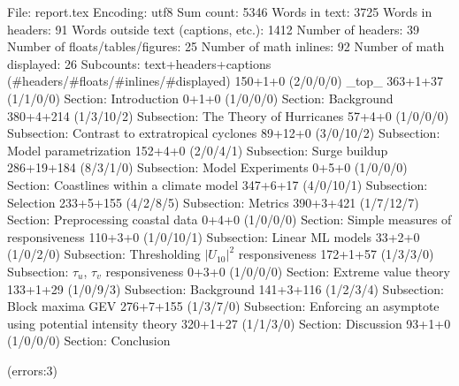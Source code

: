 
File: report.tex
Encoding: utf8
Sum count: 5346
Words in text: 3725
Words in headers: 91
Words outside text (captions, etc.): 1412
Number of headers: 39
Number of floats/tables/figures: 25
Number of math inlines: 92
Number of math displayed: 26
Subcounts:
  text+headers+captions (#headers/#floats/#inlines/#displayed)
  150+1+0 (2/0/0/0) _top_
  363+1+37 (1/1/0/0) Section: Introduction
  0+1+0 (1/0/0/0) Section: Background
  380+4+214 (1/3/10/2) Subsection: The Theory of Hurricanes
  57+4+0 (1/0/0/0) Subsection: Contrast to extratropical cyclones
  89+12+0 (3/0/10/2) Subsection: Model parametrization
  152+4+0 (2/0/4/1) Subsection: Surge buildup
  286+19+184 (8/3/1/0) Subsection: Model Experiments
  0+5+0 (1/0/0/0) Section: Coastlines within a climate model
  347+6+17 (4/0/10/1) Subsection: Selection
  233+5+155 (4/2/8/5) Subsection: Metrics
  390+3+421 (1/7/12/7) Section: Preprocessing coastal data
  0+4+0 (1/0/0/0) Section: Simple measures of responsiveness
  110+3+0 (1/0/10/1) Subsection: Linear ML models
  33+2+0 (1/0/2/0) Subsection: Thresholding $|U_{10}|^2$ responsiveness
  172+1+57 (1/3/3/0) Subsection: $\tau_u$, $\tau_v$ responsiveness
  0+3+0 (1/0/0/0) Section: Extreme value theory
  133+1+29 (1/0/9/3) Subsection: Background
  141+3+116 (1/2/3/4) Subsection: Block maxima GEV
  276+7+155 (1/3/7/0) Subsection: Enforcing an asymptote using potential intensity theory 
  320+1+27 (1/1/3/0) Section: Discussion
  93+1+0 (1/0/0/0) Section: Conclusion

(errors:3)
